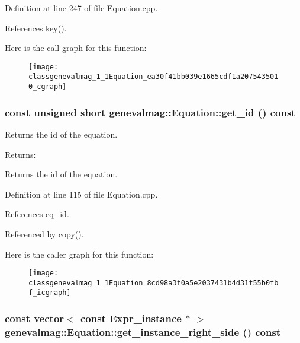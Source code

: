Definition at line 247 of file Equation.cpp.

References key().

Here is the call graph for this function:\nopagebreak
\begin{figure}[H]
\begin{center}
\leavevmode
\texttt{[image: classgenevalmag\_1\_1Equation\_ea30f41bb039e1665cdf1a2075435010\_cgraph]}
\end{center}
\end{figure}
\hypertarget{classgenevalmag_1_1Equation_8cd98a3f0a5e2037431b4d31f55b0fbf}{
\subsubsection[{get\_\-id}]{\setlength{\rightskip}{0pt plus 5cm}const unsigned short genevalmag::Equation::get\_\-id () const}}
\label{classgenevalmag_1_1Equation_8cd98a3f0a5e2037431b4d31f55b0fbf}


Returns the id of the equation. \begin{Desc}
\item[Returns:]\end{Desc}
Returns the id of the equation. 

Definition at line 115 of file Equation.cpp.

References eq\_\-id.

Referenced by copy().

Here is the caller graph for this function:\nopagebreak
\begin{figure}[H]
\begin{center}
\leavevmode
\texttt{[image: classgenevalmag\_1\_1Equation\_8cd98a3f0a5e2037431b4d31f55b0fbf\_icgraph]}
\end{center}
\end{figure}
\hypertarget{classgenevalmag_1_1Equation_81ce870d6ecab8e37d59ed929562e4c8}{
\subsubsection[{get\_\-instance\_\-right\_\-side}]{\setlength{\rightskip}{0pt plus 5cm}const vector$<$ const {\bf Expr\_\-instance} $\ast$ $>$ genevalmag::Equation::get\_\-instance\_\-right\_\-side () const}}
\label{classgenevalmag_1_1Equation_81ce870d6ecab8e37d59ed929562e4c8}


